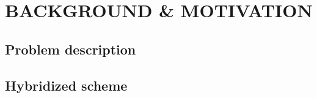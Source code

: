 %
%
%
\section{\large BACKGROUND \& MOTIVATION}


%
%
%
%

%
%
%
\subsection{Problem description}


%
%
%
\subsection{Hybridized scheme}

